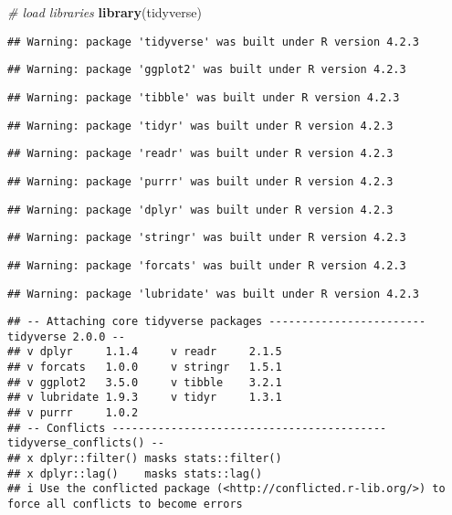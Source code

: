 \documentclass[
]{article}
\newenvironment{Shaded}{\begin{snugshade}}{\end{snugshade}}
\newcommand{\CommentTok}[1]{\textcolor[rgb]{0.56,0.35,0.01}{\textit{#1}}}
\newcommand{\FunctionTok}[1]{\textcolor[rgb]{0.13,0.29,0.53}{\textbf{#1}}}
\newcommand{\NormalTok}[1]{#1}
\begin{document}
\begin{Shaded}
\begin{Highlighting}[]
\CommentTok{\# load libraries}
\FunctionTok{library}\NormalTok{(tidyverse)}
\end{Highlighting}
\end{Shaded}

\begin{verbatim}
## Warning: package 'tidyverse' was built under R version 4.2.3
\end{verbatim}

\begin{verbatim}
## Warning: package 'ggplot2' was built under R version 4.2.3
\end{verbatim}

\begin{verbatim}
## Warning: package 'tibble' was built under R version 4.2.3
\end{verbatim}

\begin{verbatim}
## Warning: package 'tidyr' was built under R version 4.2.3
\end{verbatim}

\begin{verbatim}
## Warning: package 'readr' was built under R version 4.2.3
\end{verbatim}

\begin{verbatim}
## Warning: package 'purrr' was built under R version 4.2.3
\end{verbatim}

\begin{verbatim}
## Warning: package 'dplyr' was built under R version 4.2.3
\end{verbatim}

\begin{verbatim}
## Warning: package 'stringr' was built under R version 4.2.3
\end{verbatim}

\begin{verbatim}
## Warning: package 'forcats' was built under R version 4.2.3
\end{verbatim}

\begin{verbatim}
## Warning: package 'lubridate' was built under R version 4.2.3
\end{verbatim}

\begin{verbatim}
## -- Attaching core tidyverse packages ------------------------ tidyverse 2.0.0 --
## v dplyr     1.1.4     v readr     2.1.5
## v forcats   1.0.0     v stringr   1.5.1
## v ggplot2   3.5.0     v tibble    3.2.1
## v lubridate 1.9.3     v tidyr     1.3.1
## v purrr     1.0.2     
## -- Conflicts ------------------------------------------ tidyverse_conflicts() --
## x dplyr::filter() masks stats::filter()
## x dplyr::lag()    masks stats::lag()
## i Use the conflicted package (<http://conflicted.r-lib.org/>) to force all conflicts to become errors
\end{verbatim}
\end{document}
